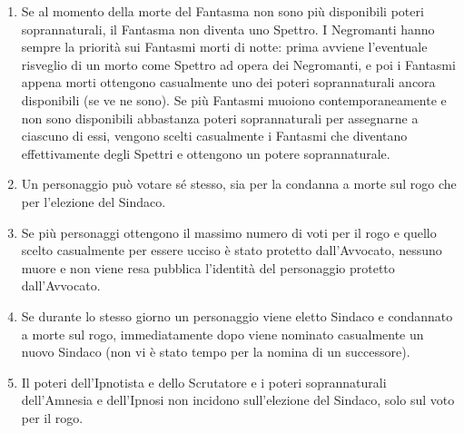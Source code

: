\documentclass[a4paper,10pt]{article}
\begin{document}
\begin{enumerate}
 \item Se al momento della morte del Fantasma non sono più disponibili poteri soprannaturali, il Fantasma non diventa uno Spettro.
 I Negromanti hanno sempre la priorità sui Fantasmi morti di notte: prima avviene l'eventuale risveglio di un morto come Spettro ad opera dei Negromanti, e poi i Fantasmi appena morti ottengono casualmente uno dei poteri soprannaturali ancora disponibili (se ve ne sono).
 Se più Fantasmi muoiono contemporaneamente e non sono disponibili abbastanza poteri soprannaturali per assegnarne a ciascuno di essi, vengono scelti casualmente i Fantasmi che diventano effettivamente degli Spettri e ottengono un potere soprannaturale.
 
 \item Un personaggio può votare sé stesso, sia per la condanna a morte sul rogo che per l'elezione del Sindaco.
 
 \item Se più personaggi ottengono il massimo numero di voti per il rogo e quello scelto casualmente per essere ucciso è stato protetto dall'Avvocato, nessuno muore e non viene resa pubblica l'identità del personaggio protetto dall'Avvocato.
 
 \item Se durante lo stesso giorno un personaggio viene eletto Sindaco e condannato a morte sul rogo, immediatamente dopo viene nominato casualmente un nuovo Sindaco (non vi è stato tempo per la nomina di un successore).
 
 \item Il poteri dell'Ipnotista e dello Scrutatore e i poteri soprannaturali dell'Amnesia e dell'Ipnosi non incidono sull'elezione del Sindaco, solo sul voto per il rogo.
 
 

\end{enumerate}
\end{document}
